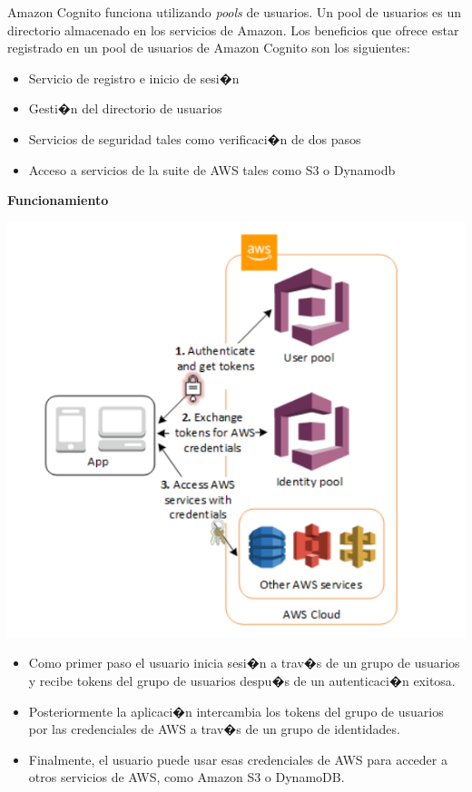 \documentclass[12pt,letterpaper]{article}
\begin{document}
Amazon Cognito funciona utilizando \emph{pools} de usuarios. Un pool de usuarios es un directorio almacenado en los servicios de Amazon\cite{cognito}. Los beneficios que ofrece estar registrado en un pool de usuarios de Amazon Cognito son los siguientes:



\begin{itemize}

\item Servicio de registro e inicio de sesi�n
\item Gesti�n del directorio de usuarios
\item Servicios de seguridad tales como verificaci�n de dos pasos
\item Acceso a servicios de la suite de AWS	tales como S3 o Dynamodb




\end{itemize}


\textbf{Funcionamiento}


\begin{center}
  \includegraphics[scale=0.5]{imagenes/cognito}
 \label{fig:cognito} 
\end{center} 


\begin{itemize}
\item Como primer paso el usuario inicia sesi�n a trav�s de un grupo de usuarios y recibe tokens del grupo de usuarios despu�s de un
autenticaci�n exitosa.

\item Posteriormente la aplicaci�n intercambia los tokens del grupo de usuarios por las credenciales de AWS a trav�s de un grupo de identidades.

\item Finalmente, el usuario puede usar esas credenciales de AWS para acceder a otros servicios de AWS, como
Amazon S3 o DynamoDB.

\end{itemize}
\end{document}
